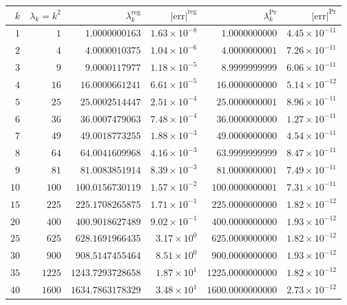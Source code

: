 \documentclass[12pt,reqno]{amsart}
\numberwithin{equation}{section}
\begin{document}
\begin{table}[ht]
\centering\footnotesize
\setlength{\tabcolsep}{5pt}
\begin{tabular}{rrrrrr}
\toprule
$k$ & $\lambda_k = k^2$ & $\lambda_k^{\text{reg}}$ & $|\text{err}|^{\text{reg}}$ & $\lambda_k^{\text{Pr}}$ & $|\text{err}|^{\text{Pr}}$ \\
\midrule
$1$  & $1$    & $1.0000000163$    & $1.63\times 10^{-8}$ & $1.0000000000$    & $4.45\times 10^{-11}$ \\
$2$  & $4$    & $4.0000010375$    & $1.04\times 10^{-6}$ & $4.0000000001$    & $7.26\times 10^{-11}$ \\
$3$  & $9$    & $9.0000117977$    & $1.18\times 10^{-5}$ & $8.9999999999$    & $6.06\times 10^{-11}$ \\
$4$  & $16$   & $16.0000661241$   & $6.61\times 10^{-5}$ & $16.0000000000$   & $5.14\times 10^{-12}$ \\
$5$  & $25$   & $25.0002514447$   & $2.51\times 10^{-4}$ & $25.0000000001$   & $8.96\times 10^{-11}$ \\
$6$  & $36$   & $36.0007479063$   & $7.48\times 10^{-4}$ & $36.0000000000$   & $1.27\times 10^{-11}$ \\
$7$  & $49$   & $49.0018773255$   & $1.88\times 10^{-3}$ & $49.0000000000$   & $4.54\times 10^{-11}$ \\
$8$  & $64$   & $64.0041609968$   & $4.16\times 10^{-3}$ & $63.9999999999$   & $8.47\times 10^{-11}$ \\
$9$  & $81$   & $81.0083851914$   & $8.39\times 10^{-3}$ & $81.0000000001$   & $7.49\times 10^{-11}$ \\
$10$ & $100$  & $100.0156730119$  & $1.57\times 10^{-2}$ & $100.0000000001$  & $7.31\times 10^{-11}$ \\
$15$ & $225$  & $225.1708265875$  & $1.71\times 10^{-1}$ & $225.0000000000$  & $1.82\times 10^{-12}$ \\
$20$ & $400$  & $400.9018627489$  & $9.02\times 10^{-1}$ & $400.0000000000$  & $1.93\times 10^{-12}$ \\
$25$ & $625$  & $628.1691966435$  & $3.17\times 10^{0}$  & $625.0000000000$  & $1.82\times 10^{-12}$ \\
$30$ & $900$  & $908.5147455464$  & $8.51\times 10^{0}$  & $900.0000000000$  & $1.93\times 10^{-12}$ \\
$35$ & $1225$ & $1243.7293728658$ & $1.87\times 10^{1}$  & $1225.0000000000$ & $1.82\times 10^{-12}$ \\
$40$ & $1600$ & $1634.7863178329$ & $3.48\times 10^{1}$  & $1600.0000000000$ & $2.73\times 10^{-12}$ \\

\end{tabular}
\end{table}
\end{document}
